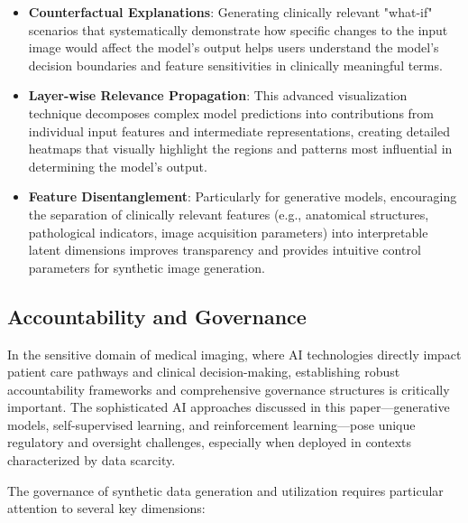 \documentclass{article}
\begin{document}
\begin{itemize}
    
    \item \textbf{Counterfactual Explanations}: Generating clinically relevant "what-if" scenarios that systematically demonstrate how specific changes to the input image would affect the model's output helps users understand the model's decision boundaries and feature sensitivities in clinically meaningful terms.
    
    \item \textbf{Layer-wise Relevance Propagation}: This advanced visualization technique decomposes complex model predictions into contributions from individual input features and intermediate representations, creating detailed heatmaps that visually highlight the regions and patterns most influential in determining the model's output.
    
    \item \textbf{Feature Disentanglement}: Particularly for generative models, encouraging the separation of clinically relevant features (e.g., anatomical structures, pathological indicators, image acquisition parameters) into interpretable latent dimensions improves transparency and provides intuitive control parameters for synthetic image generation.
\end{itemize}


\subsection{Accountability and Governance}
In the sensitive domain of medical imaging, where AI technologies directly impact patient care pathways and clinical decision-making, establishing robust accountability frameworks and comprehensive governance structures is critically important. The sophisticated AI approaches discussed in this paper—generative models, self-supervised learning, and reinforcement learning—pose unique regulatory and oversight challenges, especially when deployed in contexts characterized by data scarcity.

The governance of synthetic data generation and utilization requires particular attention to several key dimensions:
\end{document}
